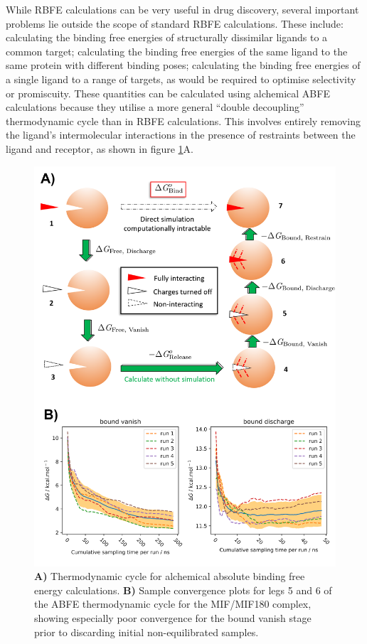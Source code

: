 While RBFE calculations can be very useful in drug discovery, several important problems lie outside the scope of standard RBFE calculations. These include: calculating the binding free energies of structurally dissimilar ligands to a common target; calculating the binding free energies of the same ligand to the same protein with different binding poses; calculating the  binding free energies of a single ligand to a range of targets, as would be required to optimise selectivity or promiscuity. These quantities can be calculated using alchemical ABFE calculations because they utilise a more general ``double decoupling'' thermodynamic cycle than in RBFE calculations.\cite{gilson_statistical-thermodynamic_1997} This involves entirely removing the ligand's intermolecular interactions in the presence of restraints between the ligand and receptor, as shown in figure \ref{abfe_fig}A. 

\begin{figure}[htp]
\includegraphics[width=\linewidth]{LIVECOMS/04_fep/abfe-tutorial.png}
\caption{ \textbf{A)} Thermodynamic cycle for alchemical absolute binding free energy calculations. \textbf{B)} Sample convergence plots for legs 5 and 6 of the ABFE thermodynamic cycle for the MIF/MIF180 complex, showing especially poor convergence for the bound vanish stage prior to discarding initial non-equilibrated samples.} 
\label{abfe_fig}
\end{figure}

